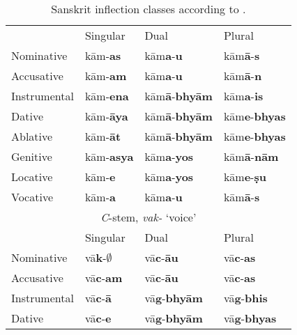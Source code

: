 \begin{table}
    \centering
    \caption{Sanskrit inflection classes according to \textcite{Whitney.1986}.} \label{tab:aistems-sanskrit}
    \begin{tabular}{llll}
      \lsptoprule
      \multicolumn{4}{c}{\textit{a}-stem, \textit{kāma-} `desire'}                                          \\
      \midrule
      & Singular                 & Dual                         & Plural                       \\
      Nominative   & kām-\textbf{as}          & kām\textbf{a}-\textbf{u}     & kām\textbf{ā}-\textbf{s}     \\
      Accusative   & kām-\textbf{am}          & kām\textbf{a}-\textbf{u}     & kām\textbf{ā}-\textbf{n}     \\
      Instrumental & kām-\textbf{ena}         & kām\textbf{ā}-\textbf{bhyām} & kām\textbf{a}-\textbf{is}    \\
      Dative       & kām-\textbf{āya}         & kām\textbf{ā}-\textbf{bhyām} & kām\textbf{e}-\textbf{bhyas} \\
      Ablative     & kām-\textbf{āt}          & kām\textbf{ā}-\textbf{bhyām} & kām\textbf{e}-\textbf{bhyas} \\
      Genitive     & kām-\textbf{asya}        & kām\textbf{a}-\textbf{yos}   & kām\textbf{ā}-\textbf{nām}   \\
      Locative     & kām-\textbf{e}           & kām\textbf{a}-\textbf{yos}   & kām\textbf{e}-\textbf{ṣu}    \\
      Vocative     & kām-\textbf{a}           & kām\textbf{a}-\textbf{u}     & kām\textbf{ā}-\textbf{s}     \\
      \midrule
      \multicolumn{4}{c}{\textit{C}-stem, \textit{vak-} `voice'}                                            \\
      \midrule
      & Singular                 & Dual     & Plural   \\
      Nominative   & vā\textbf{k}-$\emptyset$ & vā\textbf{c}-\textbf{āu}    & vā\textbf{c}-\textbf{as}    \\
      Accusative   & vā\textbf{c}-\textbf{am}          & vā\textbf{c}-\textbf{āu}    & vā\textbf{c}-\textbf{as}    \\
      Instrumental & vā\textbf{c}-\textbf{ā }          & vā\textbf{g}-\textbf{bhyām} & vā\textbf{g}-\textbf{bhis}  \\
      Dative       & vā\textbf{c}-\textbf{e }          & vā\textbf{g}-\textbf{bhyām} & vā\textbf{g}-\textbf{bhyas} \\

\end{tabular}
\end{table}
